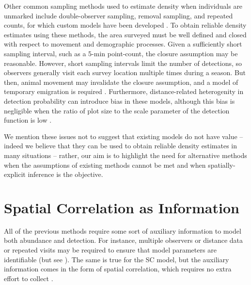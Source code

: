 Other common sampling methods used to estimate density when individuals are
unmarked include double-observer sampling, removal sampling, and
repeated counts, for which custom models have been developed
\citep{nichols_etal:2000, farnsworth_etal:2002, royle:2004biom,
  royle:2004abc, nichols_etal:2009,fiske_chandler:2011}. To
obtain reliable density estimates using these
methods, the area surveyed must be well defined and closed with
respect to movement and demographic processes. Given a sufficiently short
sampling interval, such as a 5-min point-count, the closure
assumption may be reasonable. However, short sampling intervals limit
the number of detections, so observers generally visit each survey
location multiple times during a season. But then, animal
movement may invalidate the closure assumption, and a model of
temporary emigration is required
\citep{kendall_etal:1997,chandler_etal:2011}. Furthermore,
distance-related heterogenity in detection probability can introduce
bias in these models, although this bias is negligible when the
ratio of plot size to the scale parameter of the detection function is low
\citep{efford_dawson:2009}.

We mention these issues not to suggest that existing models do not
have value -- indeed we believe that they can be used to obtain
reliable density estimates in many situations -- rather, our aim is to
highlight the need for alternative methods when the assumptions of
existing methods cannot be met and when spatially-explicit inference
is the objective. %


\section{Spatial Correlation as Information}
\label{sect.corr-info}

All of the previous methods require some sort of auxiliary information
to model both abundance and detection. For instance, %
multiple observers or distance data or repeated visits
may be required
to ensure
that model parameters are identifiable (but see
  \citep{lele_etal:2012, solymos_etal:2012}). The same is true for
the SC model, but the auxiliary information comes in the form of spatial
correlation, which requires no extra effort to collect
\citep{chandler_royle:2012}. %

